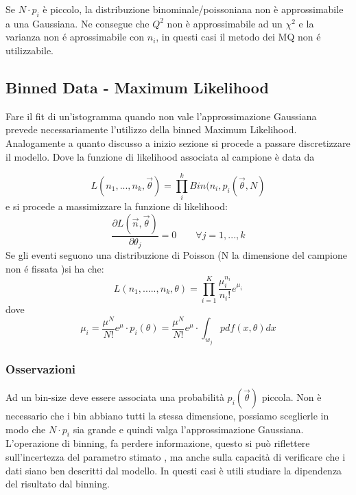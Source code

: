 	Se $N \cdot p_i$ \`{e} piccolo, la distribuzione binominale/poissoniana non \`{e} approssimabile a una Gaussiana. Ne consegue che $Q^2$ non \`{e} approssimabile ad un $\chi^2$ e la varianza non \'{e} aprossimabile con $n_i$, in questi casi il metodo dei MQ non \'{e} utilizzabile.
	
	\subsection{Binned Data - Maximum Likelihood}
	Fare il fit di un'istogramma quando non vale l'approssimazione Gaussiana prevede necessariamente l'utilizzo della binned Maximum Likelihood. Analogamente a quanto discusso a inizio sezione si procede a passare discretizzare il modello. Dove la funzione di likelihood associata al campione \`{e} data da
	
	\begin{equation*}
		L(n_1,...,n_k,\vec{\theta}) = \prod_{i}^k Bin(n_i,p_i(\vec{\theta},N)
	\end{equation*}
e si procede a massimizzare la funzione di likelihood:
\begin{equation*}
	\dfrac{\partial L(\vec{n},\vec{\theta})}{\partial \theta_j}= 0 \quad \quad \forall j=1,...,k
\end{equation*}
\newline
Se gli eventi seguono una distribuzione di Poisson (N la dimensione del campione non \'{e} fissata )si ha che:
\begin{equation*}
	L(n_1,.....,n_k, \theta) = \prod_{i =1}^K \dfrac{\mu_i^{n_i}}{n_i!}e^{\mu_i}
\end{equation*}
dove
\begin{equation*}
	\mu_i = \dfrac{\mu^N}{N!}e^{\mu} \cdot p_i(\theta) = \dfrac{\mu^N}{N!}e^{\mu} \cdot \int_{w_j} pdf(x,\theta)dx 
\end{equation*}

\subsubsection{Osservazioni}
Ad un bin-size deve essere associata una probabilit\`{a} $p_{i}(\vec{\theta})$ piccola. Non \`{e} necessario che i bin abbiano tutti la stessa dimensione, possiamo sceglierle in modo che $N \cdot p_i$ sia grande e quindi valga l'approssimazione Gaussiana.\newline
L'operazione di binning, fa perdere informazione, questo si pu\`{o} riflettere sull'incertezza del parametro stimato , ma anche sulla capacit\`{a} di verificare che i dati siano ben descritti dal modello. In questi casi \`{e} utili studiare la dipendenza del risultato dal binning.

